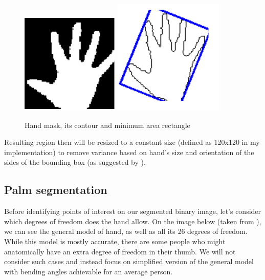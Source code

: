 \documentclass[a4paper,11pt,oneside]{article}
\begin{document}
  \begin{figure}[H]
  \centering
  \includegraphics[scale=1.5]{hand-mask.png}
\includegraphics[scale=1.5]{hand-box.png}
\caption{Hand mask, its contour and minimum area rectangle}
\end{figure}

Resulting region then will be resized to a constant size (defined as 120x120 in my implementation) to remove variance based on hand's size and orientation of the sides of the bounding box (as suggested by \cite{HI01}).

  \subsection{Palm segmentation}
  
 Before identifying points of interest on our segmented binary image, let's consider which degrees of freedom does the hand allow. On the image below (taken from \cite{OT01}), we can see the general model of hand, as well as all its 26 degrees of freedom. While this model is mostly accurate, there are some people who might anatomically have an extra degree of freedom in their thumb. We will not consider such cases and instead focus on simplified version of the general model with bending angles achievable for an average person.\\
  
\end{document}
